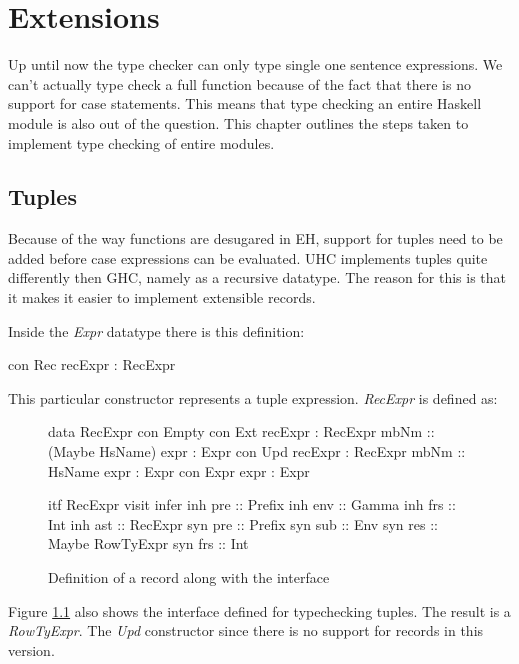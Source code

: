 \chapter{Extensions}
\label{cap:Extensions}
Up until now the type checker can only type single one sentence expressions. We can't actually type check a full function because of the fact that there is no support for case statements. This means that type checking an entire Haskell module is also out of the question. This chapter outlines the steps taken to implement type checking of entire modules.

\section{Tuples}
Because of the way functions are desugared in EH, support for tuples need to  be added before case expressions can be evaluated. UHC implements tuples quite differently then GHC, namely as a recursive datatype. The reason for this is that it makes it easier to implement extensible records.

Inside the \emph{Expr} datatype there is this definition:
\begin{code}
  con Rec
    recExpr       :  RecExpr
\end{code}

This particular constructor represents a tuple expression. \emph{RecExpr} is defined as:

\begin{figure}[H]
\begin{minipage}[t]{0.5\linewidth}
\begin{code}
data RecExpr
  con Empty
  con Ext
    recExpr     :  RecExpr
    mbNm        :: (Maybe HsName)
    expr        :  Expr
  con Upd
    recExpr     :  RecExpr
    mbNm        :: HsName
    expr        :  Expr
  con Expr
    expr        :  Expr
\end{code}
\end{minipage}
\begin{minipage}[t]{0.5\linewidth}
\begin{code}
itf RecExpr
  visit infer
    inh pre  :: Prefix
    inh env  :: Gamma
    inh frs  :: Int
    inh ast  :: RecExpr
    syn pre  :: Prefix
    syn sub  :: Env
    syn res  :: Maybe RowTyExpr
    syn frs  :: Int 
\end{code}
\end{minipage}
\label{record}
\caption{Definition of a record along with the interface}
\end{figure}
Figure \ref{record} also shows the interface defined for typechecking tuples. The result is a \emph{RowTyExpr}. The \emph{Upd} constructor since there is no support for records in this version.

